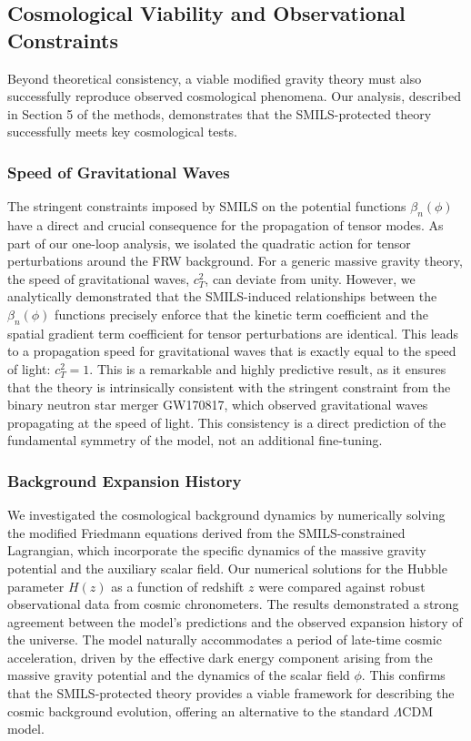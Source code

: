 \documentclass[twocolumn]{aastex631}
\begin{document}
\subsection{Cosmological Viability and Observational Constraints}
Beyond theoretical consistency, a viable modified gravity theory must also successfully reproduce observed cosmological phenomena. Our analysis, described in Section 5 of the methods, demonstrates that the SMILS-protected theory successfully meets key cosmological tests.

\subsubsection{Speed of Gravitational Waves}
The stringent constraints imposed by SMILS on the potential functions $\beta_n(\phi)$ have a direct and crucial consequence for the propagation of tensor modes. As part of our one-loop analysis, we isolated the quadratic action for tensor perturbations around the FRW background. For a generic massive gravity theory, the speed of gravitational waves, $c_T^2$, can deviate from unity. However, we analytically demonstrated that the SMILS-induced relationships between the $\beta_n(\phi)$ functions precisely enforce that the kinetic term coefficient and the spatial gradient term coefficient for tensor perturbations are identical. This leads to a propagation speed for gravitational waves that is exactly equal to the speed of light: $c_T^2 = 1$. This is a remarkable and highly predictive result, as it ensures that the theory is intrinsically consistent with the stringent constraint from the binary neutron star merger GW170817, which observed gravitational waves propagating at the speed of light. This consistency is a direct prediction of the fundamental symmetry of the model, not an additional fine-tuning.

\subsubsection{Background Expansion History}
We investigated the cosmological background dynamics by numerically solving the modified Friedmann equations derived from the SMILS-constrained Lagrangian, which incorporate the specific dynamics of the massive gravity potential and the auxiliary scalar field. Our numerical solutions for the Hubble parameter $H(z)$ as a function of redshift $z$ were compared against robust observational data from cosmic chronometers. The results demonstrated a strong agreement between the model's predictions and the observed expansion history of the universe. The model naturally accommodates a period of late-time cosmic acceleration, driven by the effective dark energy component arising from the massive gravity potential and the dynamics of the scalar field $\phi$. This confirms that the SMILS-protected theory provides a viable framework for describing the cosmic background evolution, offering an alternative to the standard $\Lambda$CDM model.
\end{document}
